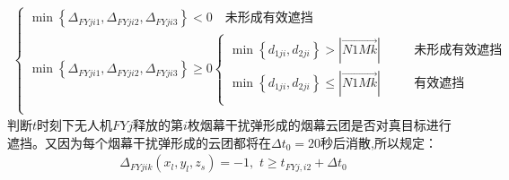 \documentclass[../main.tex]{subfiles}
\begin{document}
\begin{itemize}
\begin{align}\label{1.88}
	\left\{ \begin{array}{l}
	\min \left\{ \Delta _{FYji1},\Delta _{FYji2},\Delta _{FYji3} \right\} <0\,\,\,\,\,\,\text{未形成有效遮挡}\\
	\min \left\{ \Delta _{FYji1},\Delta _{FYji2},\Delta _{FYji3} \right\} \ge 0\left\{ \begin{array}{l}
	\min \left\{ d_{1ji},d_{2ji} \right\} >\left| \overrightarrow{N1Mk} \right|\,\,\,\,\,\,\,\,\,\,\,\,\,\,\,\,\text{未形成有效遮挡}\\
	\min \left\{ d_{1ji},d_{2ji} \right\} \le \left| \overrightarrow{N1Mk} \right|\,\,\,\,\,\,\,\,\,\,\,\,\,\,\,\,\text{有效遮挡}\\
\end{array} \right.\\
\end{array} \right. 
\end{align}
判断$t$时刻下无人机$FYj$释放的第$i$枚烟幕干扰弹形成的烟幕云团是否对真目标进行遮挡。又因为每个烟幕干扰弹形成的云团都将在$\Delta t_0 = 20$秒后消散,所以规定： 
\begin{align}\label{14.907}
	\Delta _{FYjik}\left( x_l,y_l,z_s \right) 
	=-1,\,\, t\ge t_{FYj,i2}+\Delta t_0\\
\end{align}
\end{itemize}
\end{document}
